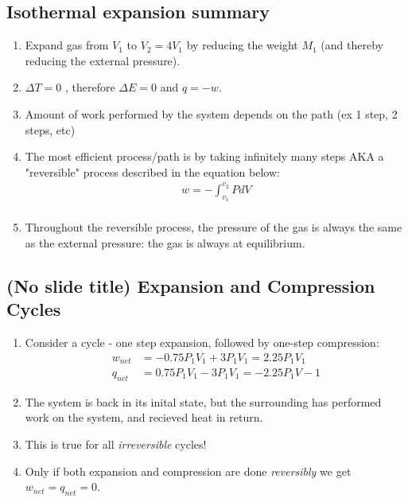 \documentclass{article}  %
\begin{document}
\subsection*{Isothermal expansion summary}
\begin{enumerate}
    \item Expand gas from $V_1$ to $V_2=4V_1$ by reducing the weight $M_1$ (and thereby reducing the external pressure).
    \item $\Delta T = 0$ , therefore $\Delta E = 0$ and $q = -w$.
    \item Amount of work performed by the system depends on the path (ex 1 step, 2 steps, etc)
    \item The most efficient process/path is by taking infinitely many steps AKA a "reversible" process described in the equation below:
        \begin{equation*}
            \begin{aligned}
                w = -\int ^{v_2}_{v_1} P dV \\
            \end{aligned}
        \end{equation*}
    \item Throughout the reversible process, the pressure of the gas is always the same as the external pressure: the gas is always at equilibrium.
\end{enumerate}

\subsection*{(No slide title) Expansion and Compression Cycles}
\begin{enumerate}
    \item Consider a cycle - one step expansion, followed by one-step compression:
        \begin{equation*}
            \begin{aligned}
                w_{net} &= -0.75P_1V_1 + 3 P_1V_1 = 2.25 P_1V_1 \\
                q_{net} &= 0.75P_1V_1 - 3 P_1 V_1 = -2.25 P_1V-1 
            \end{aligned}
        \end{equation*}
    \item The system is back in its inital state, but the surrounding has performed work on the system, and recieved heat in return.
    \item This is true for all \emph{irreversible} cycles!
    \item Only if both expansion and compression are done \emph{reversibly}  we get $w_{net}=q_{net}=0$.
\end{enumerate}
\end{document}
